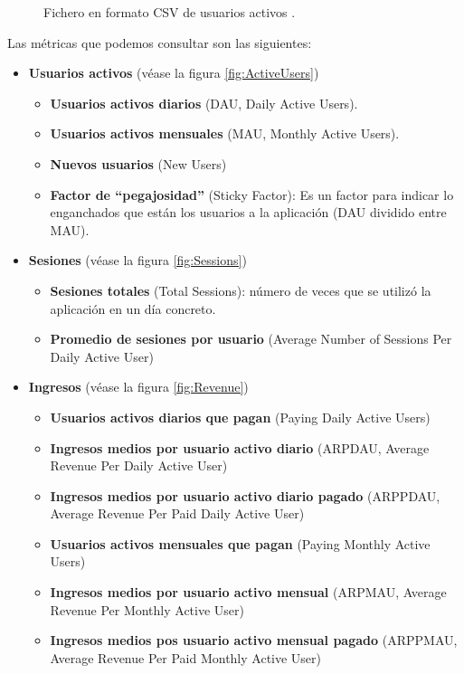 \documentclass{article}
\begin{document}
\begin{figure}[h]
\centering

\caption{Fichero en formato CSV de usuarios activos .}
\label{fig:CSV}
\end{figure}

	Las métricas que podemos consultar son las siguientes:
\begin{itemize}
	\item \textbf{Usuarios activos} (véase la figura \ref{fig:ActiveUsers})
	\begin{itemize}
		\item \textbf{Usuarios activos diarios} (DAU, Daily Active Users).
		\item \textbf{Usuarios activos mensuales} (MAU, Monthly Active Users).
		\item \textbf{Nuevos usuarios} (New Users)
		\item \textbf{Factor de ``pegajosidad''} (Sticky Factor): Es un factor para indicar lo enganchados que están los usuarios a la aplicación (DAU dividido entre MAU).
	\end{itemize}
	\item \textbf{Sesiones} (véase la figura \ref{fig:Sessions})
	\begin{itemize}
		\item \textbf{Sesiones totales} (Total Sessions): número de veces que se utilizó la aplicación en un día concreto.
		\item \textbf{Promedio de sesiones por usuario} (Average Number of Sessions Per Daily Active User)
	\end{itemize}
	\item \textbf{Ingresos} (véase la figura \ref{fig:Revenue})
	\begin{itemize}
		\item \textbf{Usuarios activos diarios que pagan} (Paying Daily Active Users)
		\item \textbf{Ingresos medios por usuario activo diario} (ARPDAU, Average Revenue Per Daily Active User)
		\item \textbf{Ingresos medios por usuario activo diario pagado} (ARPPDAU, Average Revenue Per Paid Daily Active User)
		\item \textbf{Usuarios activos mensuales que pagan} (Paying Monthly Active Users)
		\item \textbf{Ingresos medios por usuario activo mensual} (ARPMAU, Average Revenue Per Monthly Active User)
		\item \textbf{Ingresos medios pos usuario activo mensual pagado} (ARPPMAU, Average Revenue Per Paid Monthly Active User)

\end{itemize}
\end{itemize}
\end{document}
